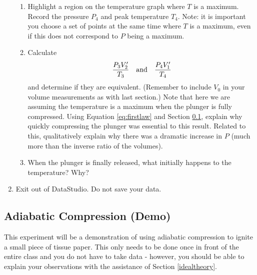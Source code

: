 \begin{enumerate}
\begin{enumerate}
		\item Highlight a region on the temperature graph where $T$ is a maximum.  Record the pressure $P_{4}$ and peak temperature $T_{4}$.  Note: it is important you choose a set of points at the same time where $T$ is a maximum, even if this does not correspond to $P$ being a maximum.
		\item Calculate
		\begin{equation}
			\frac{P_{3}V^{\prime}_{2}}{T_{3}} \textrm{\, \, and \, \,} \frac{P_{4}V^{\prime}_{1}}{T_{4}}
		\end{equation}
		and determine if they are equivalent.  (Remember to include $V_{0}$ in your volume measurements as with last section.)  Note that here we are assuming the temperature is a maximum when the plunger is fully compressed.  Using Equation \ref{eq:firstlaw} and Section \ref{procadiab}, explain why quickly compressing the plunger was essential to this result.  Related to this, qualitatively explain why there was a dramatic increase in $P$ (much more than the inverse ratio of the volumes).
		\item When the plunger is finally released, what initially happens to the temperature?  Why?
	\end{enumerate}
	\item Exit out of DataStudio.  Do not save your data.
\end{enumerate}

\subsection{Adiabatic Compression (Demo)}
\label{procadiab}
This experiment will be a demonstration of using adiabatic compression to ignite a small piece of tissue paper.  This only needs to be done once in front of the entire class and you do not have to take data - however, you should be able to explain your observations with the assistance of Section \ref{idealtheory}.

